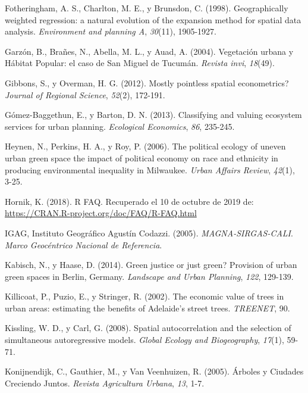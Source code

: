 \documentclass[12pt,a4paper,oneside, openany]{book}
\theoremstyle{definition}
\theoremstyle{definition}
\theoremstyle{definition}
\theoremstyle{remark}
\begin{document}
\hypertarget{ref-fotheringham_geographically_1998}{}
Fotheringham, A. S., Charlton, M. E., y Brunsdon, C. (1998).
Geographically weighted regression: a natural evolution of the expansion
method for spatial data analysis. \emph{Environment and planning A},
\emph{30}(11), 1905-1927.

\hypertarget{ref-garzon2004vegetacion}{}
Garzón, B., Brañes, N., Abella, M. L., y Auad, A. (2004). Vegetación
urbana y Hábitat Popular: el caso de San Miguel de Tucumán.
\emph{Revista invi}, \emph{18}(49).

\hypertarget{ref-gibbons_mostly_2012}{}
Gibbons, S., y Overman, H. G. (2012). Mostly pointless spatial
econometrics? \emph{Journal of Regional Science}, \emph{52}(2), 172-191.

\hypertarget{ref-gomez-baggethun_classifying_2013}{}
Gómez-Baggethun, E., y Barton, D. N. (2013). Classifying and valuing
ecosystem services for urban planning. \emph{Ecological Economics},
\emph{86}, 235-245.

\hypertarget{ref-heynen_political_2006}{}
Heynen, N., Perkins, H. A., y Roy, P. (2006). The political ecology of
uneven urban green space the impact of political economy on race and
ethnicity in producing environmental inequality in Milwaukee.
\emph{Urban Affairs Review}, \emph{42}(1), 3-25.

\hypertarget{ref-R-cran}{}
Hornik, K. (2018). R FAQ. Recuperado el 10 de octubre de 2019 de:
\url{https://CRAN.R-project.org/doc/FAQ/R-FAQ.html}

\hypertarget{ref-igagMC2005}{}
IGAG, Instituto Geográfico Agustín Codazzi. (2005).
\emph{MAGNA-SIRGAS-CALI}. \emph{Marco Geocéntrico Nacional de
Referencia}.

\hypertarget{ref-kabisch_green_2014}{}
Kabisch, N., y Haase, D. (2014). Green justice or just green? Provision
of urban green spaces in Berlin, Germany. \emph{Landscape and Urban
Planning}, \emph{122}, 129-139.

\hypertarget{ref-killicoat_economic_2002}{}
Killicoat, P., Puzio, E., y Stringer, R. (2002). The economic value of
trees in urban areas: estimating the benefits of Adelaide's street
trees. \emph{TREENET}, 90.

\hypertarget{ref-kissling_spatial_2008}{}
Kissling, W. D., y Carl, G. (2008). Spatial autocorrelation and the
selection of simultaneous autoregressive models. \emph{Global Ecology
and Biogeography}, \emph{17}(1), 59-71.

\hypertarget{ref-konijnendijk_arboles_2005}{}
Konijnendijk, C., Gauthier, M., y Van Veenhuizen, R. (2005). Árboles y
Ciudades Creciendo Juntos. \emph{Revista Agricultura Urbana}, \emph{13},
1-7.
\end{document}
